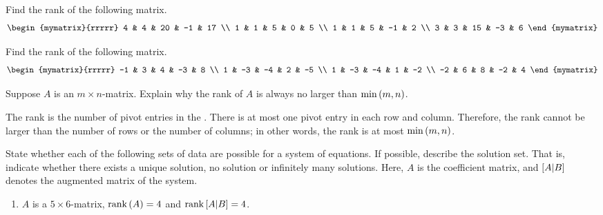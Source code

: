 \begin{enumialphparenastyle}
\begin{ex} Find the rank of the following matrix.
\begin{equation*}
\begin{mymatrix}{rrrrr}
4 & 4 & 20 & -1 & 17 \\
1 & 1 & 5 & 0 & 5 \\
1 & 1 & 5 & -1 & 2 \\
3 & 3 & 15 & -3 & 6
\end{mymatrix}
\end{equation*}
\end{ex}

\begin{ex} Find the rank of the following matrix.
\begin{equation*}
\begin{mymatrix}{rrrrr}
-1 & 3 & 4 & -3 & 8 \\
1 & -3 & -4 & 2 & -5 \\
1 & -3 & -4 & 1 & -2 \\
-2 & 6 & 8 & -2 & 4
\end{mymatrix}
\end{equation*}
\end{ex}

\begin{ex}
  Suppose $A$ is an $m\times n$-matrix. Explain why the rank of $A$ is
  always no larger than $\min \left(m,n\right)$.
  \begin{sol}
    The rank is the number of pivot entries in the {\ef}. There is at
    most one pivot entry in each row and column. Therefore, the rank
    cannot be larger than the number of rows or the number of columns;
    in other words, the rank is at most $\min\left(m,n\right)$.
  \end{sol}
\end{ex}

\begin{ex}
  State whether each of the following sets of data are
  possible for a system of equations. If possible, describe the
  solution set.  That is, indicate whether there exists a unique
  solution, no solution or infinitely many solutions. Here, $A$ is
  the coefficient matrix, and $\left[A|B \right]$ denotes the
  augmented matrix of the system.
  
  \begin{enumerate}
  \item $A$ is a $5\times 6$-matrix, $\mbox{\rm rank}\left(A\right) =4$ and 
    $\mbox{\rm rank}\left[A|B \right] =4$. 
    

\end{enumerate}
\end{ex}
\end{enumialphparenastyle}
